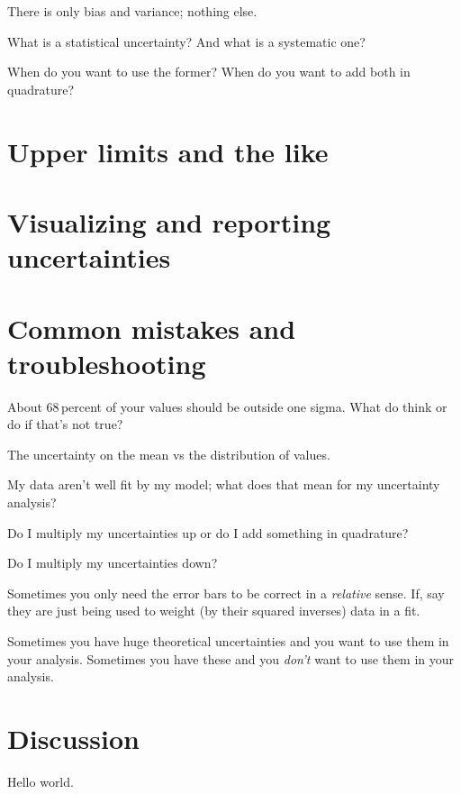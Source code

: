 \documentclass[10pt]{article}
\begin{document}
There is only bias and variance; nothing else.

What is a statistical uncertainty? And what is a systematic one?

When do you want to use the former? When do you want to add both in quadrature?

\section{Upper limits and the like}

\section{Visualizing and reporting uncertainties}

\section{Common mistakes and troubleshooting}

About 68\,percent of your values should be outside one sigma. What do think
or do if that's not true?

The uncertainty on the mean vs the distribution of values.

My data aren't well fit by my model; what does that mean for my uncertainty
analysis?

Do I multiply my uncertainties up or do I add something in quadrature?

Do I multiply my uncertainties down?

Sometimes you only need the error bars to be correct in a
\emph{relative} sense. If, say they are just being used to weight (by
their squared inverses) data in a fit.

Sometimes you have huge theoretical uncertainties and you want to use
them in your analysis. Sometimes you have these and you \emph{don't} want
to use them in your analysis.

\section{Discussion}

Hello world.

\clearpage\raggedright

\end{document}
